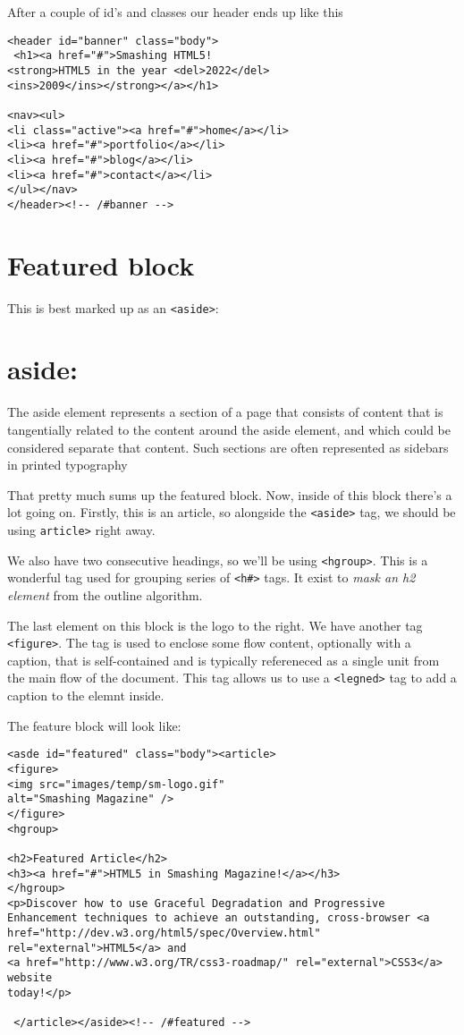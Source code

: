 \documentclass[a4paper, 12pt]{book}
\begin{document}
After a couple of id's and classes our header ends up like this
\begin{verbatim}
<header id="banner" class="body">
 <h1><a href="#">Smashing HTML5!
<strong>HTML5 in the year <del>2022</del>
<ins>2009</ins></strong></a></h1>

<nav><ul>
<li class="active"><a href="#">home</a></li>
<li><a href="#">portfolio</a></li>
<li><a href="#">blog</a></li>
<li><a href="#">contact</a></li>
</ul></nav>
</header><!-- /#banner -->
\end{verbatim}
\section{Featured block}
This is best marked up as an \verb|<aside>|:
\section{aside:} The aside element represents a section of a page that
consists of content that is tangentially related to the content around the aside
element, and which could be considered separate that content. Such sections are
often represented as sidebars in printed typography

That pretty much sums up the featured block.  Now, inside of this block there's
a lot going on. Firstly, this is an article, so alongside the \verb|<aside>|
tag, we should be using \verb|article>| right away.

We also have two consecutive headings, so we'll be using \verb|<hgroup>|. This
is a wonderful tag used for grouping series of \verb|<h#>| tags. It exist to
\emph{mask an h2 element} from the outline algorithm.

The last element on this block is the logo to the right. We have another
tag \verb|<figure>|. The tag is used to enclose some flow content, optionally
with a caption, that is self-contained and is typically refereneced as a single
unit from the main flow of the document. This tag allows us to use a
\verb|<legned>| tag to add a caption to the elemnt inside.

The feature block will look like:
\begin{verbatim}
<asde id="featured" class="body"><article>
<figure>
<img src="images/temp/sm-logo.gif"
alt="Smashing Magazine" />
</figure>
<hgroup>

<h2>Featured Article</h2>
<h3><a href="#">HTML5 in Smashing Magazine!</a></h3>
</hgroup>
<p>Discover how to use Graceful Degradation and Progressive
Enhancement techniques to achieve an outstanding, cross-browser <a
href="http://dev.w3.org/html5/spec/Overview.html" rel="external">HTML5</a> and
<a href="http://www.w3.org/TR/css3-roadmap/" rel="external">CSS3</a> website
today!</p>

 </article></aside><!-- /#featured -->
\end{verbatim}
\end{document}
